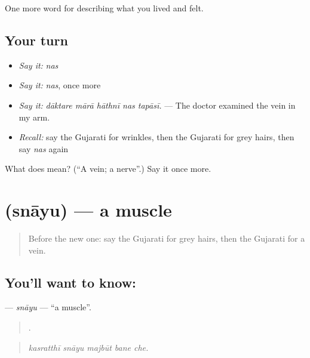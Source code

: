 \begin{grammarlens}[title={What you've built}]
One more word for describing what you lived and felt.
\end{grammarlens}

\subsection*{Your turn}
\begin{itemize}
\raggedright
  \item \emph{Say it:} \emph{nas}
  \item \emph{Say it:} \emph{nas}, once more
  \item \emph{Say it:} \emph{dāktare mārā hāthnī nas tapāsī.} — The doctor examined the vein in my arm.
  \item \emph{Recall:} say the Gujarati for wrinkles, then the Gujarati for grey hairs, then say \emph{nas} again
\end{itemize}

\begin{tcolorbox}[breakable,colback=teal!4,colframe=teal!35!black,title={Before you move on}]
What does  mean? (\textquotedblleft{}A vein; a nerve\textquotedblright{}.) Say it once more.
\end{tcolorbox}
\section[\texorpdfstring{\gu{સ્નાયુ} (snāyu)}{સ્નાયુ (snāyu)}]{ (snāyu) — a muscle}

\label{lesson:GU-C472-snayu}



\begin{quote}
Before the new one: say the Gujarati for grey hairs, then the Gujarati for a vein.
\end{quote}

\subsection*{You'll want to know: }
\textbf{} — \emph{snāyu} — \textquotedblleft{}a muscle\textquotedblright{}.

\begin{quote}
    .
\end{quote}

\begin{quote}
\emph{kasratthī snāyu majbūt bane che.}
\end{quote}

